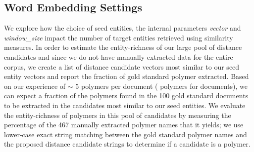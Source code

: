 \subsection{Word Embedding Settings}
We explore how the choice of seed entities, the internal parameters \textit{vector} and \textit{window_size}  impact the number of target entities retrieved using similarity measures.
In order to estimate the entity-richness of our large pool of distance candidates and since we do not have manually extracted data for the entire corpus, we create a list of  distance candidate vectors most similar to our seed entity vectors and report the fraction of gold standard polymer extracted. 
Based on our experience of $\sim$ 5 polymers per document ( polymers for  documents), we can expect a fraction of the polymers found in the 100 gold standard documents to be extracted in the  candidates most similar to our seed entities.
We evaluate the entity-richness of polymers in this pool of candidates by measuring the percentage of the 467 manually extracted polymer names that it yields;
we use lower-case exact string matching between the gold standard polymer names and the proposed distance candidate strings to determine if a candidate is a polymer.

